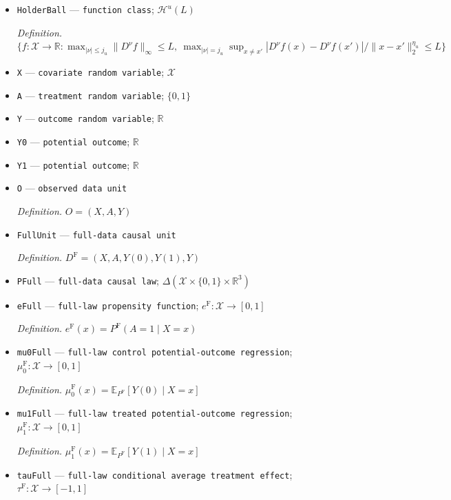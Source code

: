 \documentclass{article}
\begin{document}
\begin{itemize}
  \item \texttt{HolderBall} --- \texttt{function class}; \(\mathcal H^u(L)\)
  \par\smallskip\noindent\emph{Definition.} \(\{f:\mathcal X\to\mathbb R:\max_{|\nu|\le j_u}\|D^\nu f\|_\infty\le L,\ \max_{|\nu|=j_u}\sup_{x\ne x'}|D^\nu f(x)-D^\nu f(x')|/\|x-x'\|_2^{\eta_u}\le L\}\)
  \item \texttt{X} --- \texttt{covariate random variable}; \(\mathcal X\)
  \item \texttt{A} --- \texttt{treatment random variable}; \(\{0,1\}\)
  \item \texttt{Y} --- \texttt{outcome random variable}; \(\mathbb R\)
  \item \texttt{Y0} --- \texttt{potential outcome}; \(\mathbb R\)
  \item \texttt{Y1} --- \texttt{potential outcome}; \(\mathbb R\)
  \item \texttt{O} --- \texttt{observed data unit}
  \par\smallskip\noindent\emph{Definition.} \(O=(X,A,Y)\)
  \item \texttt{FullUnit} --- \texttt{full-\allowbreak{}data causal unit}
  \par\smallskip\noindent\emph{Definition.} \(D^{\mathrm F}=(X,A,Y(0),Y(1),Y)\)
  \item \texttt{PFull} --- \texttt{full-\allowbreak{}data causal law}; \(\Delta(\mathcal X\times\{0,1\}\times\mathbb R^3)\)
  \item \texttt{eFull} --- \texttt{full-\allowbreak{}law propensity function}; \(e^{\mathrm F}:\mathcal X\to[0,1]\)
  \par\smallskip\noindent\emph{Definition.} \(e^{\mathrm F}(x)=P^{\mathrm F}(A=1\mid X=x)\)
  \item \texttt{mu0Full} --- \texttt{full-\allowbreak{}law control potential-\allowbreak{}outcome regression}; \(\mu_0^{\mathrm F}:\mathcal X\to[0,1]\)
  \par\smallskip\noindent\emph{Definition.} \(\mu_0^{\mathrm F}(x)=\mathbb E_{P^{\mathrm F}}[Y(0)\mid X=x]\)
  \item \texttt{mu1Full} --- \texttt{full-\allowbreak{}law treated potential-\allowbreak{}outcome regression}; \(\mu_1^{\mathrm F}:\mathcal X\to[0,1]\)
  \par\smallskip\noindent\emph{Definition.} \(\mu_1^{\mathrm F}(x)=\mathbb E_{P^{\mathrm F}}[Y(1)\mid X=x]\)
  \item \texttt{tauFull} --- \texttt{full-\allowbreak{}law conditional average treatment effect}; \(\tau^{\mathrm F}:\mathcal X\to[-1,1]\)

\end{itemize}
\end{document}
